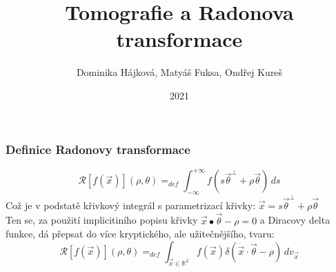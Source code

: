 \documentclass{beamer}
\title{Tomografie a Radonova transformace}
\author{Dominika Hájková, Matyáš Fuksa, Ondřej Kureš}
\institute{Stormtrooperz}
\date{2021}
\newcommand{\vectordot}[2]{\ensuremath{#1 \bullet #2}}
\begin{document}
\frame{\titlepage}

\begin{frame}
\frametitle{Definice Radonovy transformace}
\begin{equation*}
\mathcal{R}[f(\vec{x})](\rho, \theta)=_{def} \int_{-\infty}^{+\infty}f(s \vec{\theta}^\perp + \rho \vec{\theta}) \,ds
\end{equation*}
Což je v podstatě křivkový integrál s parametrizací křivky: $\vec{x} = s \vec{\theta}^\perp + \rho \vec{\theta}$ \\
Ten se, za použití implicitiního popisu křivky $ \vectordot{\vec{x}}{\vec{\theta}} - \rho = 0$ a Diracovy delta funkce, dá přepsat do více kryptického, ale užitečnějšího, tvaru: 
\begin{equation*}
\mathcal{R}[f(\vec{x})](\rho, \theta)=_{def} \int_{\vec{x}\in \mathbb{R}^2}f(\vec{x})\delta \left(\vec{x}\cdot\vec{\theta} - \rho\right) \,dv_{\vec{x}} 
\end{equation*}
\end{frame}
\end{document}
